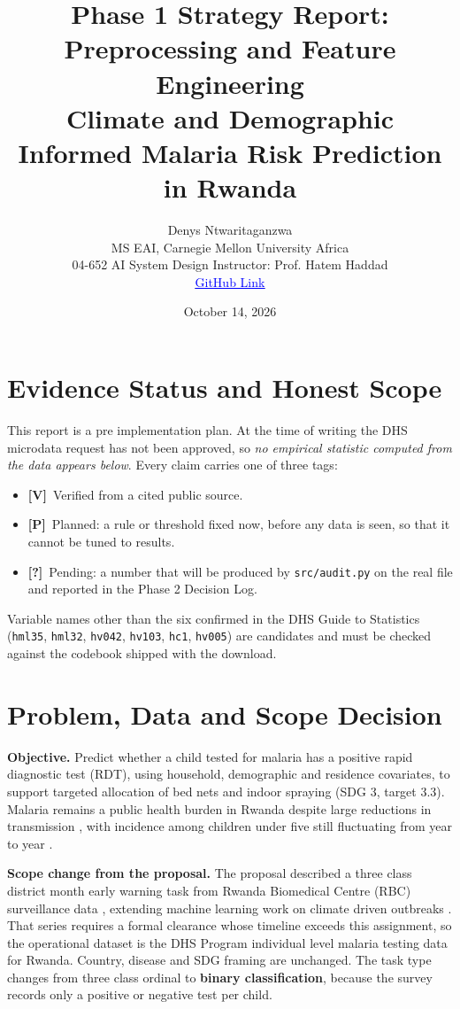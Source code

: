 \documentclass[11pt,a4paper]{article}
\title{\vspace{-1em}Phase 1 Strategy Report: Preprocessing and Feature Engineering\\[2pt]
\large Climate and Demographic Informed Malaria Risk Prediction in Rwanda}
\author{Denys Ntwaritaganzwa \\ MS EAI, Carnegie Mellon University Africa \\
04-652 AI System Design \quad Instructor: Prof. Hatem Haddad \\ \quad \href{https://github.com/dntwaritag/malaria-risk-prediction-rwanda}{\textcolor{blue}{\underline{GitHub Link}}}}
\date{October 14, 2026}
\newcommand{\V}{\textbf{[V]}}   %
\newcommand{\Pl}{\textbf{[P]}}   %
\newcommand{\Q}{\textbf{[?]}}   %
\begin{document}
\maketitle

\section*{Evidence Status and Honest Scope}
This report is a pre implementation plan. At the time of writing the DHS microdata request has not been approved, so \emph{no empirical statistic computed from the data appears below}. Every claim carries one of three tags:
\begin{itemize}
\item \V\ Verified from a cited public source.
\item \Pl\ Planned: a rule or threshold fixed now, before any data is seen, so that it cannot be tuned to results.
\item \Q\ Pending: a number that will be produced by \texttt{src/audit.py} on the real file and reported in the Phase 2 Decision Log.
\end{itemize}
Variable names other than the six confirmed in the DHS Guide to Statistics (\texttt{hml35}, \texttt{hml32}, \texttt{hv042}, \texttt{hv103}, \texttt{hc1}, \texttt{hv005}) are candidates and must be checked against the codebook shipped with the download.

\section{Problem, Data and Scope Decision}
\textbf{Objective.} Predict whether a child tested for malaria has a positive rapid diagnostic test (RDT), using household, demographic and residence covariates, to support targeted allocation of bed nets and indoor spraying (SDG 3, target 3.3). Malaria remains a public health burden in Rwanda despite large reductions in transmission \cite{mohrwanda2019,who2024}, with incidence among children under five still fluctuating from year to year \cite{rbc2024}.

\textbf{Scope change from the proposal.} The proposal described a three class district month early warning task from Rwanda Biomedical Centre (RBC) surveillance data \cite{rbc2024}, extending machine learning work on climate driven outbreaks \cite{martineau2022,khan2024,nkiruka2021}. That series requires a formal clearance whose timeline exceeds this assignment, so the operational dataset is the DHS Program individual level malaria testing data for Rwanda. Country, disease and SDG framing are unchanged. The task type changes from three class ordinal to \textbf{binary classification}, because the survey records only a positive or negative test per child.
\end{document}
